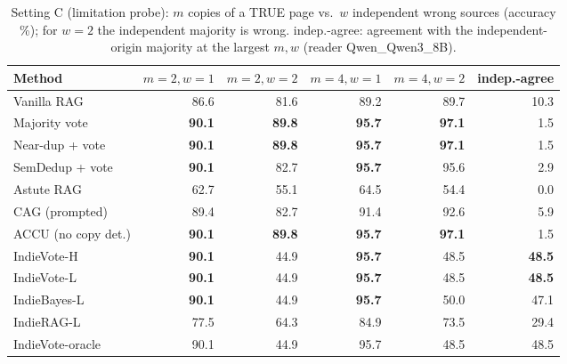 \begin{table}[tbp]
\centering
\small
\caption{Setting C (limitation probe): $m$ copies of a TRUE page vs.\ $w$ independent wrong sources (accuracy \%); for $w{=}2$ the independent majority is wrong. indep.-agree: agreement with the independent-origin majority at the largest $m,w$ (reader Qwen\_Qwen3\_8B).}
\label{tab:symC:Qwen_Qwen3_8B}
\setlength{\tabcolsep}{4pt}
\begin{tabular}{lrrrrr}
\toprule
Method & $m{=}2,w{=}1$ & $m{=}2,w{=}2$ & $m{=}4,w{=}1$ & $m{=}4,w{=}2$ & indep.-agree \\
\midrule
Vanilla RAG & 86.6 & 81.6 & 89.2 & 89.7 & 10.3 \\
Majority vote & \textbf{90.1} & \textbf{89.8} & \textbf{95.7} & \textbf{97.1} & 1.5 \\
Near-dup + vote & \textbf{90.1} & \textbf{89.8} & \textbf{95.7} & \textbf{97.1} & 1.5 \\
SemDedup + vote & \textbf{90.1} & 82.7 & \textbf{95.7} & 95.6 & 2.9 \\
Astute RAG & 62.7 & 55.1 & 64.5 & 54.4 & 0.0 \\
CAG (prompted) & 89.4 & 82.7 & 91.4 & 92.6 & 5.9 \\
ACCU (no copy det.) & \textbf{90.1} & \textbf{89.8} & \textbf{95.7} & \textbf{97.1} & 1.5 \\
IndieVote-H & \textbf{90.1} & 44.9 & \textbf{95.7} & 48.5 & \textbf{48.5} \\
IndieVote-L & \textbf{90.1} & 44.9 & \textbf{95.7} & 48.5 & \textbf{48.5} \\
IndieBayes-L & \textbf{90.1} & 44.9 & \textbf{95.7} & 50.0 & 47.1 \\
IndieRAG-L & 77.5 & 64.3 & 84.9 & 73.5 & 29.4 \\
IndieVote-oracle & 90.1 & 44.9 & 95.7 & 48.5 & 48.5 \\
\bottomrule
\end{tabular}
\end{table}
